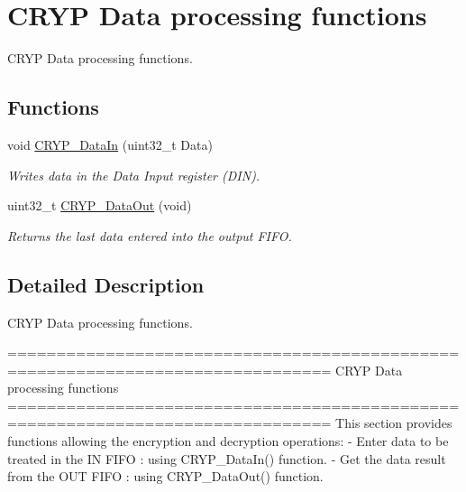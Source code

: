 \hypertarget{group___c_r_y_p___group2}{\section{C\-R\-Y\-P Data processing functions}
\label{group___c_r_y_p___group2}
}


C\-R\-Y\-P Data processing functions.  


\subsection*{Functions}
\begin{DoxyCompactItemize}
\item 
void \hyperlink{group___c_r_y_p___group2_ga16dc76244318d464357ee6ff208bf9a4}{C\-R\-Y\-P\-\_\-\-Data\-In} (uint32\-\_\-t Data)
\begin{DoxyCompactList}\small\item\em Writes data in the Data Input register (D\-I\-N). \end{DoxyCompactList}\item 
uint32\-\_\-t \hyperlink{group___c_r_y_p___group2_gacbe5fcf4c7e4919192376fa615588b54}{C\-R\-Y\-P\-\_\-\-Data\-Out} (void)
\begin{DoxyCompactList}\small\item\em Returns the last data entered into the output F\-I\-F\-O. \end{DoxyCompactList}\end{DoxyCompactItemize}


\subsection{Detailed Description}
C\-R\-Y\-P Data processing functions. \begin{DoxyVerb} ===============================================================================
                      CRYP Data processing functions
 ===============================================================================  
  This section provides functions allowing the encryption and decryption 
  operations: 
  - Enter data to be treated in the IN FIFO : using CRYP_DataIn() function.
  - Get the data result from the OUT FIFO : using CRYP_DataOut() function.\end{DoxyVerb}
 


